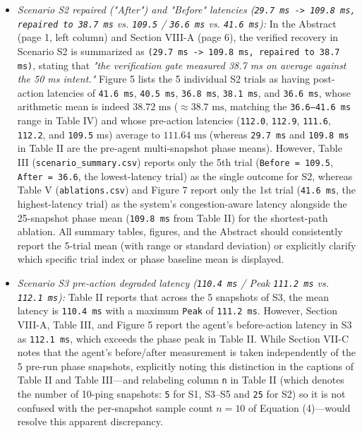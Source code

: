 \documentclass[11pt,a4paper]{article}
\begin{document}
\begin{itemize}[leftmargin=1.8em,itemsep=2pt]
\item \emph{Scenario S2 repaired ("After") and "Before" latencies (\texttt{29.7 ms -> 109.8 ms, repaired to 38.7 ms} vs. \texttt{109.5} / \texttt{36.6 ms} vs. \texttt{41.6 ms}):} In the Abstract (page 1, left column) and Section VIII-A (page 6), the verified recovery in Scenario S2 is summarized as \texttt{(29.7 ms -> 109.8 ms, repaired to 38.7 ms)}, stating that \emph{"the verification gate measured 38.7 ms on average against the 50 ms intent."} Figure 5 lists the 5 individual S2 trials as having post-action latencies of \texttt{41.6 ms}, \texttt{40.5 ms}, \texttt{36.8 ms}, \texttt{38.1 ms}, and \texttt{36.6 ms}, whose arithmetic mean is indeed $38.72\text{ ms}$ ($\approx 38.7\text{ ms}$, matching the \texttt{36.6–41.6 ms} range in Table IV) and whose pre-action latencies (\texttt{112.0}, \texttt{112.9}, \texttt{111.6}, \texttt{112.2}, and \texttt{109.5} ms) average to $111.64\text{ ms}$ (whereas \texttt{29.7 ms} and \texttt{109.8 ms} in Table II are the pre-agent multi-snapshot phase means). However, Table III (\texttt{scenario\_summary.csv}) reports only the 5th trial (\texttt{Before = 109.5}, \texttt{After = 36.6}, the lowest-latency trial) as the single outcome for S2, whereas Table V (\texttt{ablations.csv}) and Figure 7 report only the 1st trial (\texttt{41.6 ms}, the highest-latency trial) as the system's congestion-aware latency alongside the 25-snapshot phase mean (\texttt{109.8 ms} from Table II) for the shortest-path ablation. All summary tables, figures, and the Abstract should consistently report the 5-trial mean (with range or standard deviation) or explicitly clarify which specific trial index or phase baseline mean is displayed.
\item \emph{Scenario S3 pre-action degraded latency (\texttt{110.4 ms} / Peak \texttt{111.2 ms} vs. \texttt{112.1 ms}):} Table II reports that across the 5 snapshots of S3, the mean latency is \texttt{110.4 ms} with a maximum \texttt{Peak} of \texttt{111.2 ms}. However, Section VIII-A, Table III, and Figure 5 report the agent's before-action latency in S3 as \texttt{112.1 ms}, which exceeds the phase peak in Table II. While Section VII-C notes that the agent's before/after measurement is taken independently of the 5 pre-run phase snapshots, explicitly noting this distinction in the captions of Table II and Table III—and relabeling column \texttt{n} in Table II (which denotes the number of 10-ping snapshots: \texttt{5} for S1, S3–S5 and \texttt{25} for S2) so it is not confused with the per-snapshot sample count $n = 10$ of Equation (4)—would resolve this apparent discrepancy.

\end{itemize}
\end{document}
